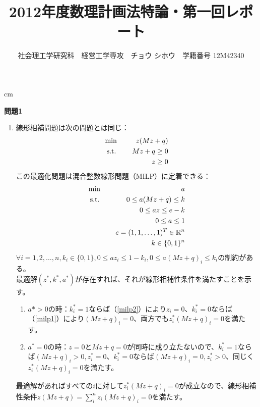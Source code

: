 \documentclass{jsarticle}
\begin{document}
\title{2012年度数理計画法特論・第一回レポート}
\author{{\normalsize 社会理工学研究科　経営工学専攻　チョウ シホウ　学籍番号 12M42340}}
\date{}
\maketitle


 cm

{\bf 問題1}
\begin{enumerate}
\item 線形相補問題は次の問題とは同じ：
\begin{eqnarray}
\text{min \,\,\,\,\,} && z(Mz+q)\\
\text{s.t. \,\,\,\,\,} && Mz +q \ge 0\\
&& z \ge 0
\end{eqnarray}
この最適化問題は混合整数線形問題（MILP）に定着できる：
\begin{eqnarray}
\text{min \,\,\,\,\,} && a\\
\text{s.t. \,\,\,\,\,} && 0 \le a(Mz+q) \le k \label{milp1}\\
&& 0 \le az \le e-k \label{milp2}\\
&&0 \le a \le 1  \\
&&e = (1,1,\dots,1)^T \in \mathbb{R}^n \\
&& k \in \{0,1\}^n
\end{eqnarray}
$\forall i = 1,2,\dots,n,k_i \in \{0,1\},0 \le az_i \le 1-k_i,0 \le a(Mz+q)_i \le k_i$の制約がある。\\
最適解$(z^*,k^*,a^*)$が存在すれば、それが線形相補性条件を満たすことを示す。
\begin{enumerate}
\item $a* > 0$の時：$k_i^*=1$ならば（\ref{milp2}）により$z_i=0$、$k_i^*=0$ならば（\ref{milp1}）により$(Mz+q)_i=0$、両方でも$z_i^*(Mz+q)_i=0$を満たす。
\item $a^*=0$の時：$z=0$と$Mz+q=0$が同時に成り立たないので、$k_i^*=1$ならば$(Mz+q)_i>0,z^*_i=0$、$k_i^*=0$ならば$(Mz+q)_i =0, z^*_i>0$、同じく$z_i^*(Mz+q)_i=0$を満たす。
\end{enumerate}
最適解があればすべての$i$に対して$z_i^*(Mz+q)_i=0$が成立なので、線形相補性条件$z(Mz+q)=\sum_{i}^n z_i(Mz+q)_i =0$を満たす。


\end{enumerate}
\end{document}
